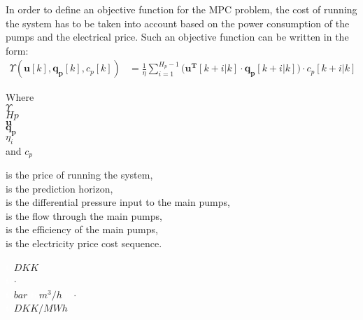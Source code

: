 In order to define an objective function for the MPC problem, the cost of running the system has to be taken into account based on the power consumption of the pumps and the electrical price. Such an objective function can be written in the form: 
%
\begin{align}
 \Upsilon(\bm{u}[k],\bm{q_p}[k],c_p[k]) &= \frac{1}{\eta} \sum_{i=1}^{H_p-1} \Big( \bm{u^T}[k+i|k] \cdot  \bm{q_{p}}[k+i|k]\Big)\cdot c_p[k+i|k] \label{eqcost} 
\end{align}
%
%
\begin{minipage}[t]{0.20\textwidth}
Where\\
\hspace*{8mm} $\Upsilon$ \\
\hspace*{8mm} $Hp$ \\
\hspace*{8mm} $\bm{u}$ \\
\hspace*{8mm} $\bm{q_p}$ \\
\hspace*{8mm} $\eta_i$ \\
and \hspace*{0.7mm} $c_p$ 
\end{minipage}
\begin{minipage}[t]{0.68\textwidth}
\vspace*{2mm}
is the price of running the system, \\
is the prediction horizon, \\
is the differential pressure input to the main pumps,\\
is the flow through the main pumps,\\
is the efficiency of the main pumps,\\
is the electricity price cost sequence.
\end{minipage}
\begin{minipage}[t]{0.10\textwidth}
\vspace*{2mm}
\textcolor{White}{te}$\unit{DKK}$\\
\textcolor{White}{te}$\unit{\cdot}$\\
\textcolor{White}{te}$\unit{bar}$
\textcolor{White}{te}$\unit{m^3/h}$
 \textcolor{White}{te}$\unit{\cdot}$\\
\textcolor{White}{te}$\unit{DKK/MWh}$
\end{minipage}

